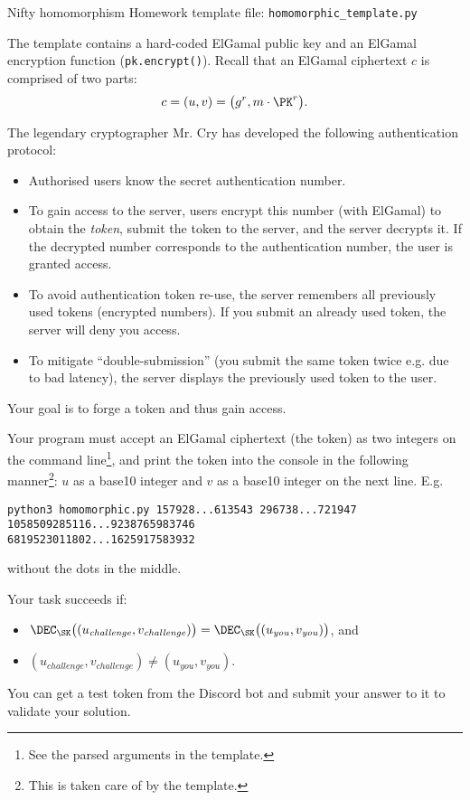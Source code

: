 \documentclass{homework}
\begin{document}
\begin{task}{Nifty homomorphism}
  Homework template file: \texttt{homomorphic\_template.py}

  The template contains a hard-coded ElGamal public key and an ElGamal encryption function (\texttt{pk.encrypt()}).
  Recall that an ElGamal ciphertext $c$ is comprised of two parts:
  \[
    c = (u, v) = \bigl(g^r, m\cdot\PK^r\bigr).
  \]

  The legendary cryptographer Mr. Cry has developed the following authentication protocol:
  \begin{itemize}
    \item Authorised users know the secret authentication number.
    \item To gain access to the server, users encrypt this number (with ElGamal) to obtain the \emph{token}, submit the token to the server, and the server decrypts it.
    If the decrypted number corresponds to the authentication number, the user is granted access.
    \item To avoid authentication token re-use, the server remembers all previously used tokens (encrypted numbers).
    If you submit an already used token, the server will deny you access.
    \item To mitigate \enquote{double-submission} (you submit the same token twice e.g. due to bad latency), the server displays the previously used token to the user.
  \end{itemize}

  Your goal is to forge a token and thus gain access.

  Your program must accept an ElGamal ciphertext (the token) as two integers on the command line\footnote{See the parsed arguments in the template.}, and print the token into the console in the following manner\footnote{This is taken care of by the template.}: $u$ as a base10 integer and $v$ as a base10 integer on the next line.
  E.g.
  \begin{Verbatim}
python3 homomorphic.py 157928...613543 296738...721947
1058509285116...9238765983746
6819523011802...1625917583932
  \end{Verbatim}
  without the dots in the middle.
  
  Your task succeeds if:
  \begin{itemize}
    \item $\DEC_\SK\bigl((u_\mathit{challenge}, v_\mathit{challenge})\bigr) = \DEC_\SK\bigl((u_\mathit{you}, v_\mathit{you})\bigr)$, and
    \item $(u_\mathit{challenge}, v_\mathit{challenge}) \neq (u_\mathit{you}, v_\mathit{you})$.
  \end{itemize}

  You can get a test token from the Discord bot and submit your answer to it to validate your solution.
\end{task}
\end{document}
